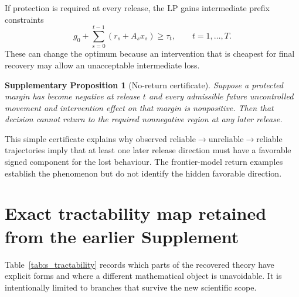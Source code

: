 \documentclass[11pt,letterpaper]{article}
\theoremstyle{plain}
\newtheorem{proposition}{Supplementary Proposition}
\newcommand{\1}{\mathbf 1}
\begin{document}
If protection is required at every release, the LP gains intermediate prefix constraints
\begin{equation}
 g_0+\sum_{s=0}^{t-1}(r_s+A_sx_s)\ge\tau_t,
 \qquad t=1,\ldots,T.
\label{eq:s_all_release_constraints}
\end{equation}
These can change the optimum because an intervention that is cheapest for final recovery may allow an unacceptable intermediate loss.

\begin{proposition}[No-return certificate]
Suppose a protected margin has become negative at release $t$ and every admissible future uncontrolled movement and intervention effect on that margin is nonpositive. Then that decision cannot return to the required nonnegative region at any later release.
\end{proposition}
This simple certificate explains why observed reliable$\to$unreliable$\to$reliable trajectories imply that at least one later release direction must have a favorable signed component for the lost behaviour. The frontier-model return examples establish the phenomenon but do not identify the hidden favorable direction.

\section{Exact tractability map retained from the earlier Supplement}
Table~\ref{tab:s_tractability} records which parts of the recovered theory have explicit forms and where a different mathematical object is unavoidable. It is intentionally limited to branches that survive the new scientific scope.
\end{document}
